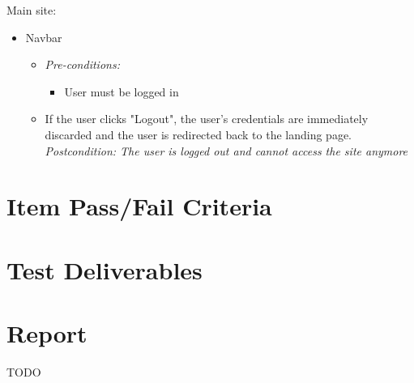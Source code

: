 \documentclass{article}
\begin{document}
				Main site:
				\begin{itemize}
					\item Navbar
					\begin{itemize}
						\item \textit{Pre-conditions:}
							\begin{itemize}
								\item User must be logged in
							\end{itemize}
						\item If the user clicks "Logout", the user's credentials are immediately discarded and the user is redirected back to the landing page. \textit{Postcondition: The user is logged out and cannot access the site anymore}
					\end{itemize}
				\end{itemize}
\section{Item Pass/Fail Criteria}

\section{Test Deliverables}

\section{Report}

TODO
\end{document}
